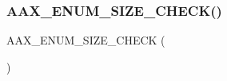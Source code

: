 \mbox{\label{a00503_a58a6a1f6c9c669ba3cbd788d290f1109}} 
\subsubsection{\texorpdfstring{AAX\_ENUM\_SIZE\_CHECK()}{AAX\_ENUM\_SIZE\_CHECK()}}
{\footnotesize\ttfamily A\+A\+X\+\_\+\+E\+N\+U\+M\+\_\+\+S\+I\+Z\+E\+\_\+\+C\+H\+E\+CK (\begin{DoxyParamCaption}\item[{\mbox{\hyperlink{a00503_a89d5cb8c7fdb11f34e695fb0e057b764}{A\+A\+X\+\_\+\+E\+View\+Container\+\_\+\+Type}}}]{ }\end{DoxyParamCaption})}

